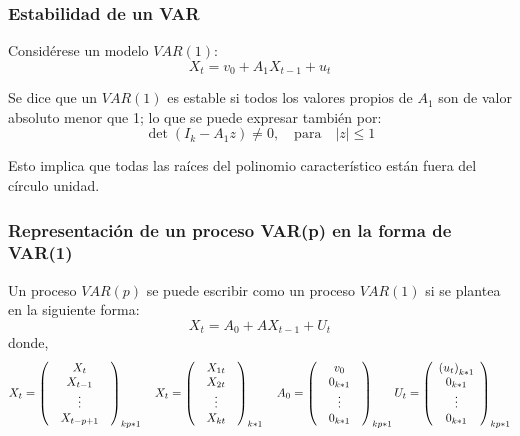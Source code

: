 \subsubsection{Estabilidad de un VAR}
Consid\'{e}rese un modelo $VAR(1)$:
\[
X_{t}=v_{0}+A_{1}X_{t-1}+u_{t}
\]

Se dice que un $VAR(1)$ es estable si todos los valores propios de $A_{1}$ son de valor absoluto menor que 1; lo que se puede expresar tambi\'{e}n por:
\[
\det \left( I_{k}-A_{1}z \right)\ne 0,\quad \text{para}\quad \left| z \right|\le 1
\]

Esto implica que todas las ra\'{i}ces del polinomio caracter\'{i}stico est\'{a}n fuera del c\'{i}rculo unidad.

\subsubsection{Representaci\'{o}n de un proceso VAR(p) en la forma de VAR(1)}

Un proceso $VAR(p)$ se puede escribir como un proceso $VAR(1)$ si se plantea en la siguiente forma:
\[
X_{t}=A_{0}+AX_{t-1}+U_{t}
\]
donde,
\[
X_{t}=\left( {\begin{array}{*{20}c}
X_{t}\\
X_{t-1}\\
{\begin{array}{*{20}c}
\vdots \\
X_{t-p+1}\\
\end{array} }\\
\end{array} } \right)_{kp\ast 1}\quad
X_{t}=\left( {\begin{array}{*{20}c}
X_{1t}\\
{\begin{array}{*{20}c}
X_{2t}\\
\vdots \\
\end{array} }\\
X_{kt}\\
\end{array} } \right)_{k\ast 1}\quad
A_{0}=\left( {\begin{array}{*{20}c}
v_{0}\\
{\begin{array}{*{20}c}
0_{k\ast 1}\\
\vdots \\
\end{array} }\\
0_{k\ast 1}\\
\end{array} } \right)_{kp\ast 1}
U_{t}=\left( {\begin{array}{*{20}c}
\left( u_{t} \right)_{k\ast 1}\\
{\begin{array}{*{20}c}
0_{k\ast 1}\\
\vdots \\
\end{array} }\\
0_{k\ast 1}\\
\end{array} } \right)_{kp\ast 1}
\]

